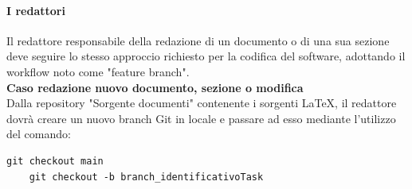 \documentclass{article}
\begin{document}



\paragraph{I redattori}

Il redattore responsabile della redazione di un documento o di una sua sezione deve seguire lo stesso approccio richiesto per la codifica del software, adottando il workflow noto come "feature branch".\\
\vspace{0.1cm}
\textbf{Caso redazione nuovo documento, sezione o modifica}\\
Dalla repository  "Sorgente documenti" contenente i sorgenti \LaTeX, il redattore dovrà creare un nuovo branch Git in locale e passare ad esso mediante l'utilizzo del comando:
\begin{lstlisting}[style=code]
    git checkout main
    git checkout -b branch_identificativoTask 
    \end{lstlisting}
\end{document}
